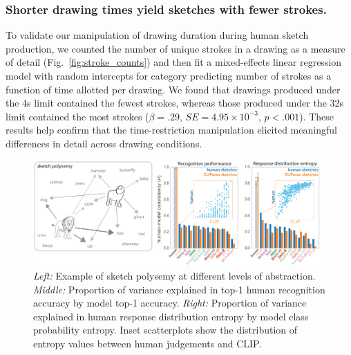 \documentclass[10pt,letterpaper]{article}
\begin{document}
\subsubsection{Shorter drawing times yield sketches with fewer strokes.}
To validate our manipulation of drawing duration during human sketch production, we counted the number of unique strokes in a drawing as a measure of detail (Fig.~\ref{fig:stroke_counts}) and then fit a mixed-effects linear regression model with random intercepts for category predicting number of strokes as a function of time allotted per drawing.
We found that drawings produced under the 4s limit contained the fewest strokes, whereas those produced under the 32s limit contained the most strokes ($\beta=.29$, $SE=4.95 \times10^{-3}$, $p<.001$).
These results help confirm that the time-restriction manipulation elicited meaningful differences in detail across drawing conditions.
\begin{figure}
    \centering
\includegraphics[width=1\linewidth]{figures/VAB_polysemy_no_mocov2.pdf}
    \caption{\textit{Left:} Example of sketch polysemy at different levels of abstraction. \textit{Middle:} Proportion of variance explained in top-1 human recognition accuracy by model top-1 accuracy. \textit{Right:} Proportion of variance explained in human response distribution entropy by model class probability entropy. Inset scatterplots show the distribution of entropy values between human judgements and CLIP.}
    \vspace{-1em}
    \label{fig:VAB_polysemy}
\end{figure}
\end{document}
